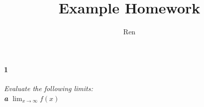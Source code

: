 \documentclass[12pt]{article}
\author{Ren}
\title{Example Homework}
\begin{document}
	\paragraph{1}
	\textit{
	Evaluate the following limits:\\
	\textbf{a} $\lim_{x \to \infty} f(x)$
	}
\end{document}
